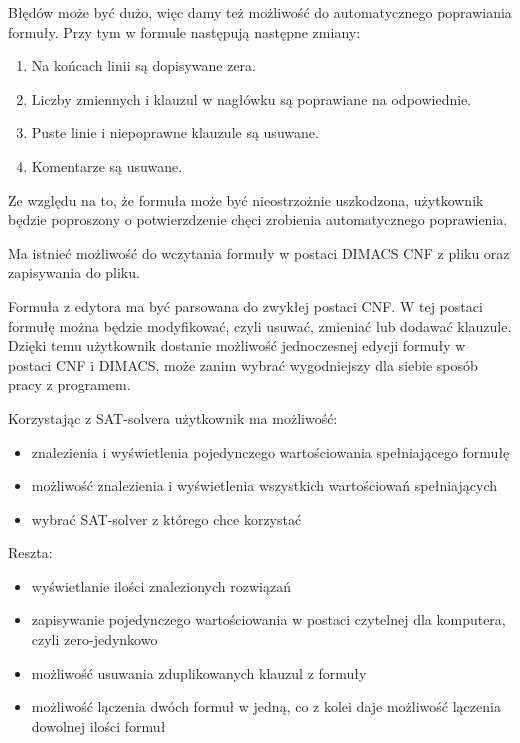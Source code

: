 \documentclass[a4paper,12pt,oneside]{book}
\theoremstyle{definition}
\begin{document}
Błędów może być dużo, więc damy też możliwość do automatycznego poprawiania formuły. Przy tym w formule następują następne zmiany:

\begin{enumerate}
    \item Na końcach linii są dopisywane zera.
    \item Liczby zmiennych i klauzul w nagłówku są poprawiane na odpowiednie.
    \item Puste linie i niepoprawne klauzule są usuwane.
    \item Komentarze są usuwane.
\end{enumerate}

\noindent Ze względu na to, że formuła może być nieostrzożnie uszkodzona, użytkownik będzie poproszony o potwierzdzenie chęci zrobienia automatycznego poprawienia.

Ma istnieć możliwość do wczytania formuły w postaci DIMACS CNF z pliku oraz zapisywania do pliku.

Formuła z edytora ma być parsowana do zwykłej postaci CNF. W tej postaci formułę można będzie modyfikować, czyli usuwać, zmieniać lub dodawać klauzule. Dzięki temu użytkownik dostanie możliwość jednoczesnej edycji formuły w postaci CNF i DIMACS, może zanim wybrać wygodniejszy dla siebie sposób pracy z programem.

Korzystając z SAT-solvera użytkownik ma możliwość:

\begin{itemize}
    \item znalezienia i wyświetlenia pojedynczego wartościowania spełniającego formułę
    \item możliwość znalezienia i wyświetlenia wszystkich wartościowań spełniających
    \item wybrać SAT-solver z którego chce korzystać
\end{itemize}

Reszta:

\begin{itemize}
    \item wyświetlanie ilości znalezionych rozwiązań
    \item zapisywanie pojedynczego wartościowania w postaci czytelnej dla komputera, czyli zero-jedynkowo
    \item możliwość usuwania zduplikowanych klauzul z formuły
    \item możliwość lączenia dwóch formuł w jedną, co z kolei daje możliwość lączenia dowolnej ilości formuł
\end{itemize}
\end{document}
